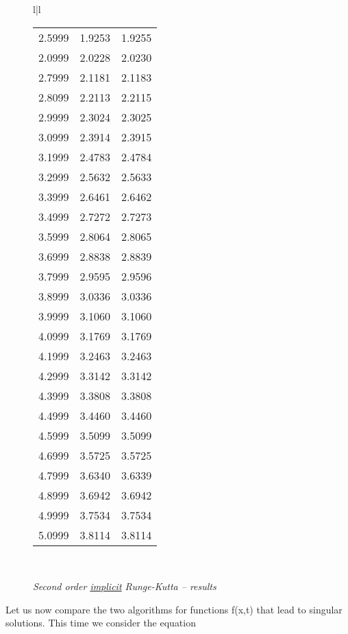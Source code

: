 \begin{figure}
\begin{tabular}{l|l}
\begin{tabular}{ccc}
            2.5999 & 1.9253 & 1.9255 \\
            2.0999 & 2.0228 & 2.0230 \\
            2.7999 & 2.1181 & 2.1183 \\
            2.8099 & 2.2113 & 2.2115 \\
            2.9999 & 2.3024 & 2.3025 \\
            3.0999 & 2.3914 & 2.3915 \\
            3.1999 & 2.4783 & 2.4784 \\
            3.2999 & 2.5632 & 2.5633 \\
            3.3999 & 2.6461 & 2.6462 \\
            3.4999 & 2.7272 & 2.7273 \\
            3.5999 & 2.8064 & 2.8065 \\
            3.6999 & 2.8838 & 2.8839 \\
            3.7999 & 2.9595 & 2.9596 \\
            3.8999 & 3.0336 & 3.0336 \\
            3.9999 & 3.1060 & 3.1060 \\
            4.0999 & 3.1769 & 3.1769 \\
            4.1999 & 3.2463 & 3.2463 \\
            4.2999 & 3.3142 & 3.3142 \\
            4.3999 & 3.3808 & 3.3808 \\
            4.4999 & 3.4460 & 3.4460 \\
            4.5999 & 3.5099 & 3.5099 \\
            4.6999 & 3.5725 & 3.5725 \\
            4.7999 & 3.6340 & 3.6339 \\
            4.8999 & 3.6942 & 3.6942 \\
            4.9999 & 3.7534 & 3.7534 \\
            5.0999 & 3.8114 & 3.8114 \\
        \end{tabular}
        \\
    \end{tabular}
    \caption{\textit{Second order \underline{implicit} Runge-Kutta -- results}}
    \label{fig:06_11}
\end{figure}

Let us now compare the two algorithms for functions f(x,t) that lead to singular solutions. This time we consider the equation

